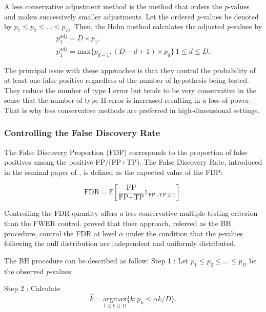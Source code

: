 \documentclass[]{book}
\begin{document}
A less conservative adjustment method is the \citep{holm1979simple}
method that orders the \emph{p}-values and makes successively smaller
adjustments. Let the ordered \emph{p}-values be denoted by
\(p_{1} \leq p_{2} \leq \dots \leq p_{D}\). Then, the Holm method
calculates the adjusted \emph{p}-values by \[\begin{aligned}
    & p_{1}^{adj} = D \times p_{1}, & \nonumber\\
    & p_{1}^{adj} = \text{max} \lbrace p_{d-1},(D-d+1) \times p_{d} \rbrace \ 1 \leq d \leq D.&\end{aligned}\]

The principal issue with these approaches is that they control the
probability of at least one false positive regardless of the number of
hypothesis being tested. They reduce the number of type I error but
tends to be very conservative in the sense that the number of type II
error is increased resulting in a loss of power. That is why less
conservative methods are preferred in high-dimensional settings.

\hypertarget{BH}{%
\subsubsection*{Controlling the False Discovery Rate}\label{BH}}

The False Discovery Proportion (FDP) corresponds to the proportion of
false positives among the positive FP/(FP+TP). The False Discovery Rate,
introduced in the seminal paper of \citep[BH,][]{benjamini_controlling_1995}, is
defined as the expected value of the FDP:

\[\text{FDR} = \mathbb{E} \left[ \frac{\text{FP}}{\text{FP+TP}} \mathbb{1}_{\text{FP+TP} \geq 1} \right]. 
\label{eq:FDR}\]

Controlling the FDR quantity offers a less conservative multiple-testing
criterion than the FWER control. \citep{benjamini_controlling_1995} proved
that their approach, referred as the BH procedure, control the FDR at
level \(\alpha\) under the condition that the \emph{p}-values following the
null distribution are independent and uniformly distributed.

The BH procedure can be described as follow:
Step 1 : Let \(p_{1} \leq p_{2} \leq \dots \leq p_{D}\) be the observed \emph{p}-values.

Step 2 : Calculate
\[\hat{k} = \underset{1\leq k \leq D}{\text{argmax}} \lbrace k:p_k \leq \alpha k/D \rbrace.\]
\end{document}
